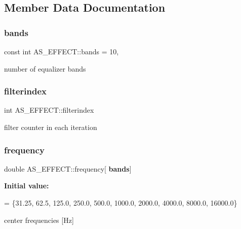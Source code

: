 \subsection{Member Data Documentation}
\mbox{\label{class_a_s___e_f_f_e_c_t_a868fe290b664fe307bb13f961b7835fb}} 
\subsubsection{bands}
{\footnotesize\ttfamily const int A\+S\+\_\+\+E\+F\+F\+E\+C\+T\+::bands = 10\hspace{0.3cm}{\ttfamily [static]}, {\ttfamily [private]}}

number of equalizer bands \mbox{\label{class_a_s___e_f_f_e_c_t_a18f7a3bbeba5a70f9d5cf8cbbb212b89}} 
\subsubsection{filterindex}
{\footnotesize\ttfamily int A\+S\+\_\+\+E\+F\+F\+E\+C\+T\+::filterindex\hspace{0.3cm}{\ttfamily [private]}}

filter counter in each iteration \mbox{\label{class_a_s___e_f_f_e_c_t_abe89c3adc1754aab1b0d429ce3d62723}} 
\subsubsection{frequency}
{\footnotesize\ttfamily double A\+S\+\_\+\+E\+F\+F\+E\+C\+T\+::frequency[\textbf{ bands}]\hspace{0.3cm}{\ttfamily [private]}}

{\bfseries Initial value\+:}
\begin{DoxyCode}
= \{31.25,
                               62.5,
                               125.0,
                               250.0,
                               500.0,
                               1000.0,
                               2000.0,
                               4000.0,
                               8000.0,
                               16000.0\}
\end{DoxyCode}
center frequencies [Hz] \mbox{\label{class_a_s___e_f_f_e_c_t_a35ed5ab347d7ea615c91ea991d689f57}} 
